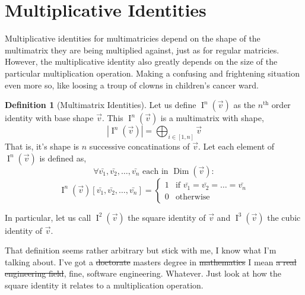 \documentclass[12pt]{book}
\theoremstyle{plain}
\theoremstyle{definition}
\newtheorem{definition}{Definition}[chapter]
\theoremstyle{ppart}
\theoremstyle{case}
\theoremstyle{solution}
\DeclareMathOperator{\Dim}{Dim}
\DeclareMathOperator{\Ident}{I}
\newcommand{\shape}[1]{\left|#1\right|}
\begin{document}
\section{Multiplicative Identities}

Multiplicative identities for multimatricies depend on the shape of the
multimatrix they are being multiplied against, just as for regular matricies.
However, the multiplicative identity also greatly depends on the size of
the particular multiplication operation. Making a confusing and frightening
situation even more so, like loosing a troup of clowns in children's cancer ward.

\begin{definition}[Multimatrix Identities]
\label{mm_mult_ident}
Let us define $\Ident^n(\vec{v})$ as the $n^{\text{th}}$ order identity with base shape
$\vec{v}$. This $\Ident^n(\vec{v})$ is a multimatrix with shape,
\[ \shape{\Ident^n(\vec{v})} = \bigoplus_{i \in [1, n]} \vec{v} \]
That is, it's shape is $n$ successive concatinations of $\vec{v}$.
Let each element of $\Ident^n(\vec{v})$ is defined as,
\[ \forall \bar{v_1}, \bar{v_2}, \ldots, \bar{v_n} \text{ each in } \Dim(\vec{v}) : \]
\[
 \Ident^n(\vec{v})[\bar{v_1}, \bar{v_2}, \ldots, \bar{v_n}]
 = \left\{
  \begin{array}{ll}
    1 & \mbox{if } \bar{v_1} = \bar{v_2} = \ldots = \bar{v_n} \\
    0 & \mbox{otherwise}
  \end{array}
 \right.
\]

In particular, let us call $\Ident^2(\vec{v})$ the square identity of $\vec{v}$ and
$\Ident^3(\vec{v})$ the cubic identity of $\vec{v}$.
\end{definition}

That definition seems rather arbitrary but stick with me, I know what I'm
talking about. I've got a \sout{doctorate}
masters degree in \sout{mathematics} I mean \sout{a real engineering field}, fine, software
engineering. Whatever. Just look at how the
square identity it relates to a multiplication operation.
\end{document}
